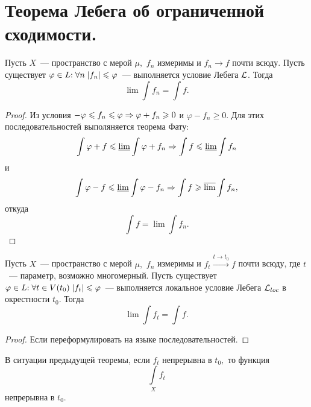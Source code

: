\documentclass{notes}
\begin{document}
\section{Теорема Лебега об ограниченной сходимости.}

	\begin{thm}
		Пусть $X$~--- пространство с мерой $\mu,$ $f_n$ измеримы и $f_n \to f$ почти всюду. Пусть существует $\varphi\in L\text{\text{:}} \; \forall n \; |f_n| \leqslant \varphi$~--- выполняется условие Лебега $\mathcal{L}$. Тогда
		\[
			\lim \int f_n = \int f.
		\]
		\begin{proof}
			Из условия $-\varphi \leqslant f_n \leqslant \varphi \Rightarrow \varphi + f_n  \geqslant 0$ и $\varphi - f_n \geqslant 0$. Для этих последовательностей выполяняется теорема Фату:
			\[
				\int \varphi + f \leqslant \underline{\lim} \int \varphi + f_n \Rightarrow \int f \leqslant \underline{\lim} \int f_n
			\]
			и
			\[
				\int \varphi - f \leqslant \underline{\lim} \int \varphi - f_n \Rightarrow \int f \geqslant \overline{\lim} \int f_n,
			\]
			откуда
			\[
				\int f = \lim \int f_n.
			\]
		\end{proof}
	\end{thm}

	\begin{cor}
		Пусть $X$~--- пространство с мерой $\mu,$ $f_n$ измеримы и $f_t \xrightarrow{t \to t_0} f$ почти всюду, где $t$~--- параметр, возможно многомерный. Пусть существует $\varphi\in L\text{\text{:}} \; \forall t \in V(t_0) \; |f_t| \leqslant \varphi$~--- выполняется локальное условие Лебега $\mathcal{L}_{loc}$ в окрестности $t_0$. Тогда
		\[
			\lim \int f_t = \int f.
		\]
		\begin{proof}
			Если переформулировать на языке последовательностей.
		\end{proof}
	\end{cor}

	\begin{cor}
		В ситуации предыдущей теоремы, если $f_t$ непрерывна в $t_0,$ то функция
		\[
			\int\limits_X f_t
		\]
		непрерывна в $t_0$.
	\end{cor}
\end{document}
